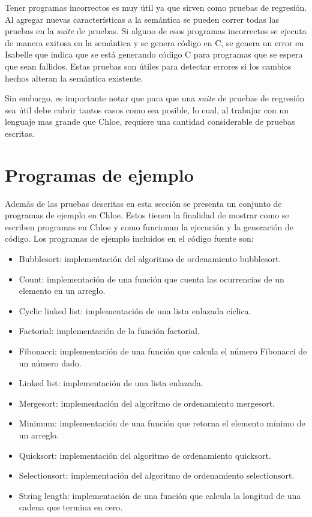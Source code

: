 Tener programas incorrectos es muy útil ya que sirven como pruebas de regresión.
Al agregar nuevas características a la semántica se pueden correr todas las pruebas en la \textit{suite} de pruebas.
Si alguno de esos programas incorrectos se ejecuta de manera exitosa en la semántica y se genera código en C, se genera un error en Isabelle que indica que se está generando código C para programas que se espera que sean fallidos.
Estas pruebas son útiles para detectar errores si los cambios hechos alteran la semántica existente.

Sin embargo, es importante notar que para que una \textit{suite} de pruebas de regresión sea útil debe cubrir tantos casos como sea posible, lo cual, al trabajar con un lenguaje mas grande que Chloe, requiere una cantidad considerable de pruebas escritas.

\section{Programas de ejemplo}

Además de las pruebas descritas en esta sección se presenta un conjunto de programas de ejemplo en Chloe.
Estos tienen la finalidad de mostrar como se escriben programas en Chloe y como funcionan la ejecución y la generación de código.
Los programas de ejemplo incluidos en el código fuente son:

\begin{itemize}
  \item{Bubblesort: implementación del algoritmo de ordenamiento bubblesort.}
  \item{Count: implementación de una función que cuenta las ocurrencias de un elemento en un arreglo.}
  \item{Cyclic linked list: implementación de una lista enlazada cíclica.}
  \item{Factorial: implementación de la función factorial.}
  \item{Fibonacci: implementación de una función que calcula el número Fibonacci de un número dado.}
  \item{Linked list: implementación de una lista enlazada.}
  \item{Mergesort: implementación del algoritmo de ordenamiento mergesort.}
  \item{Minimum: implementación de una función que retorna el elemento mínimo de un arreglo.}
  \item{Quicksort: implementación del algoritmo de ordenamiento quicksort.}
  \item{Selectionsort: implementación del algoritmo de ordenamiento selectionsort.}
  \item{String length: implementación de una función que calcula la longitud de una cadena que termina en cero.}
\end{itemize}

